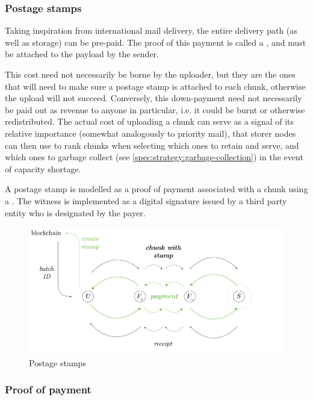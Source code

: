\subsubsection{Postage stamps}

Taking inspiration from international mail delivery, the entire delivery path (as well as storage) can be pre-paid. The proof of this payment is called a , and must be attached to the payload by the sender.

This cost need not necessarily be borne by the uploader, but they are the ones that will need to make sure a postage stamp is attached to each chunk, otherwise the upload will not succeed. Conversely, this down-payment need not necessarily be paid out as revenue to anyone in particular, i.e. it could be burnt or otherwise redistributed. The actual cost of uploading a chunk can serve as a signal of its relative importance (somewhat analogously to priority mail), that storer nodes can then use to rank chunks when selecting which ones to retain and serve, and which ones to garbage collect (see \ref{spec:strategy:garbage-collection}) in the event of capacity shortage.

A postage stamp is modelled as a proof of payment associated with a chunk using a . The witness is implemented as a digital signature issued by a third party entity who is designated by the payer.


\begin{figure}[htbp]
\centering
  \includegraphics[width=\textwidth]{fig/postage-stamp.pdf}
\caption[Postage stamps  \statusgreen]{Postage stamps}
\label{fig:postage-stamps}
\end{figure}

\subsubsection{Proof of payment}

